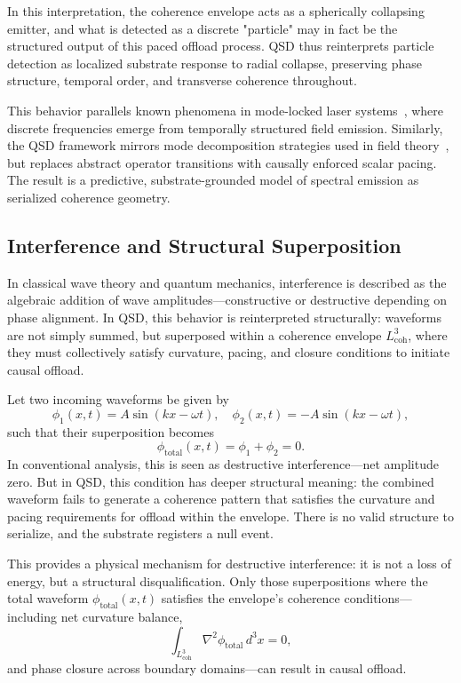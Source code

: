 \documentclass[entropy,article,submit,pdftex,oneauthor]{Definitions/mdpi}
\begin{document}
In this interpretation, the coherence envelope acts as a spherically collapsing emitter, and what is detected as a discrete "particle" may in fact be the structured output of this paced offload process. QSD thus reinterprets particle detection as localized substrate response to radial collapse, preserving phase structure, temporal order, and transverse coherence throughout.

This behavior parallels known phenomena in mode-locked laser systems~\cite{loudon2000}, where discrete frequencies emerge from temporally structured field emission. Similarly, the QSD framework mirrors mode decomposition strategies used in field theory~\cite{griffiths1995, peskin1995}, but replaces abstract operator transitions with causally enforced scalar pacing. The result is a predictive, substrate-grounded model of spectral emission as serialized coherence geometry.

\subsection{Interference and Structural Superposition}
In classical wave theory and quantum mechanics, interference is described as the algebraic addition of wave amplitudes—constructive or destructive depending on phase alignment. In QSD, this behavior is reinterpreted structurally: waveforms are not simply summed, but superposed within a coherence envelope \( L_{\text{coh}}^3 \), where they must collectively satisfy curvature, pacing, and closure conditions to initiate causal offload.

Let two incoming waveforms be given by
\[
\phi_1(x, t) = A \sin(kx - \omega t), \quad \phi_2(x, t) = -A \sin(kx - \omega t),
\]
such that their superposition becomes
\[
\phi_{\text{total}}(x, t) = \phi_1 + \phi_2 = 0.
\]
In conventional analysis, this is seen as destructive interference—net amplitude zero. But in QSD, this condition has deeper structural meaning: the combined waveform fails to generate a coherence pattern that satisfies the curvature and pacing requirements for offload within the envelope. There is no valid structure to serialize, and the substrate registers a null event.

This provides a physical mechanism for destructive interference: it is not a loss of energy, but a structural disqualification. Only those superpositions where the total waveform \( \phi_{\text{total}}(x, t) \) satisfies the envelope’s coherence conditions—including net curvature balance,
\[
\int_{L_{\text{coh}}^3} \nabla^2 \phi_{\text{total}} \, d^3x = 0,
\]
and phase closure across boundary domains—can result in causal offload.
\end{document}
